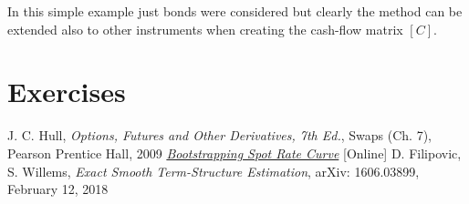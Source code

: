 In this simple example just bonds were considered but clearly the method can be extended also to other instruments when creating the cash-flow matrix $[C]$.

\section*{Exercises}


\begin{thebibliography}{9}
 J. C. Hull, \emph{Options, Futures and Other Derivatives, 7th Ed.}, Swaps (Ch. 7), Pearson Prentice Hall, 2009
 \href{https://financetrain.com/bootstrapping-spot-rate-curve-zero-curve}{\emph{Bootstrapping Spot Rate Curve}} [Online]
 D. Filipovic, S. Willems, \emph{Exact Smooth Term-Structure Estimation}, arXiv: 1606.03899, February 12, 2018
\end{thebibliography}
